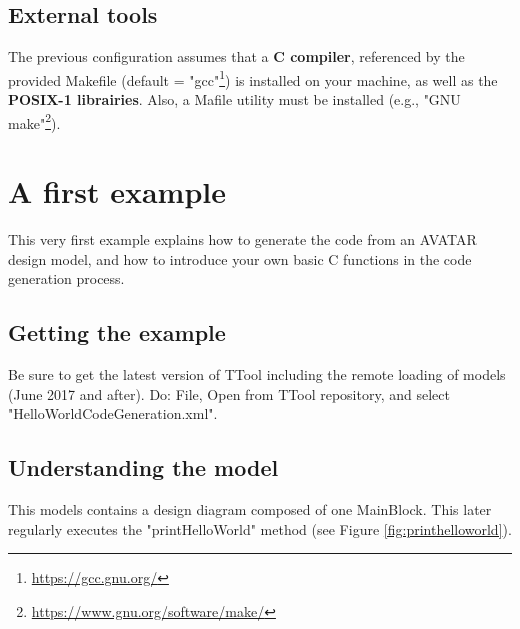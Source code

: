 \documentclass[12pt]{article}
\begin{document}
\subsection{External tools}
The previous configuration assumes that a \textbf{C compiler}, referenced by the provided Makefile (default = "gcc"\footnote{\url{https://gcc.gnu.org/}}) is installed on your machine, as well as the \textbf{POSIX-1 librairies}. Also, a Mafile utility must be installed (e.g., "GNU make"\footnote{\url{https://www.gnu.org/software/make/}}).

\newpage
\section{A first example}\label{sec:example}
This very first example explains how to generate the code from an AVATAR design model, and how to introduce your own basic C functions in the code generation process.

\subsection{Getting the example}
Be sure to get the latest version of TTool including the remote loading of models (June 2017 and after). Do: File, Open from TTool repository, and select "HelloWorldCodeGeneration.xml".

\subsection{Understanding the model}
This models contains a design diagram composed of one MainBlock. This later regularly executes the "printHelloWorld" method (see Figure \ref{fig:printhelloworld}).
\end{document}
